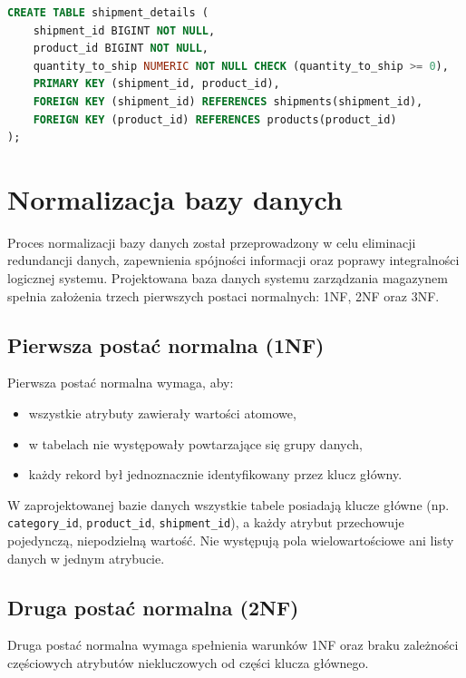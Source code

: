 \begin{lstlisting}[language=SQL, caption={Definicja tabeli shipment\_details}]
CREATE TABLE shipment_details (
    shipment_id BIGINT NOT NULL,
    product_id BIGINT NOT NULL,
    quantity_to_ship NUMERIC NOT NULL CHECK (quantity_to_ship >= 0),
    PRIMARY KEY (shipment_id, product_id),
    FOREIGN KEY (shipment_id) REFERENCES shipments(shipment_id),
    FOREIGN KEY (product_id) REFERENCES products(product_id)
);
\end{lstlisting}

\section{Normalizacja bazy danych}

Proces normalizacji bazy danych został przeprowadzony w celu eliminacji redundancji danych,
zapewnienia spójności informacji oraz poprawy integralności logicznej systemu.
Projektowana baza danych systemu zarządzania magazynem spełnia założenia trzech
pierwszych postaci normalnych: 1NF, 2NF oraz 3NF.

\subsection{Pierwsza postać normalna (1NF)}

Pierwsza postać normalna wymaga, aby:
\begin{itemize}
    \item wszystkie atrybuty zawierały wartości atomowe,
    \item w tabelach nie występowały powtarzające się grupy danych,
    \item każdy rekord był jednoznacznie identyfikowany przez klucz główny.
\end{itemize}

W zaprojektowanej bazie danych wszystkie tabele posiadają klucze główne
(np. \texttt{category\_id}, \texttt{product\_id}, \texttt{shipment\_id}),
a każdy atrybut przechowuje pojedynczą, niepodzielną wartość.
Nie występują pola wielowartościowe ani listy danych w jednym atrybucie.

\subsection{Druga postać normalna (2NF)}

Druga postać normalna wymaga spełnienia warunków 1NF oraz braku zależności
częściowych atrybutów niekluczowych od części klucza głównego.

